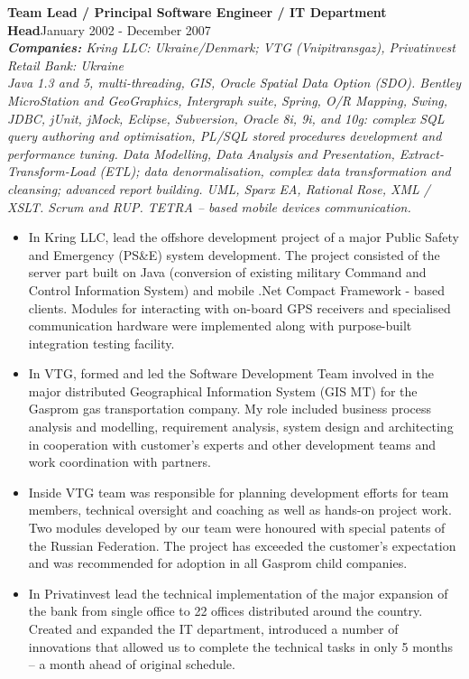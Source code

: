 \documentclass{res}
\newcommand{\aggjobdes}[4]{\needspace{3\baselineskip} %
{\noindent \bf #1\hspace{2ex}}{\hfill #2}\\
{{\noindent \small \textit{ \textbf{ Companies:} {\hfill #3}}}}\\{{\it \small #4.}}}
\begin{document}
\begin{resume}
\aggjobdes {Team Lead / Principal Software Engineer / IT Department Head}{January 2002 - December 2007}
{Kring LLC: Ukraine/Denmark; VTG (Vnipitransgaz), Privatinvest Retail Bank: Ukraine}
{Java 1.3 and 5, multi-threading, GIS, Oracle Spatial Data Option (SDO). Bentley MicroStation and GeoGraphics, Intergraph suite, Spring, O/R Mapping, Swing, JDBC, jUnit, jMock, Eclipse, Subversion, Oracle 8i, 9i, and 10g: complex SQL query authoring and optimisation, PL/SQL stored procedures development and performance tuning. Data Modelling, Data Analysis and Presentation, Extract-Transform-Load (ETL); data denormalisation, complex data transformation and cleansing; advanced report building.  UML, Sparx EA, Rational Rose, XML / XSLT. Scrum and RUP. TETRA – based mobile devices communication}
\begin{itemize} %
 \item In Kring LLC, lead the offshore development project of a major Public Safety and Emergency (PS\&E) system development. The project consisted of the server part built on Java (conversion of existing military Command and Control Information System) and mobile .Net Compact Framework - based clients. Modules for interacting with on-board GPS receivers and specialised communication hardware were implemented along with purpose-built integration testing facility.
 \item In VTG, formed and led the Software Development Team involved in the major distributed Geographical Information System (GIS MT) for the Gasprom gas transportation company. My role included business process analysis and modelling, requirement analysis, system design and architecting in cooperation with customer’s experts and other development teams and work coordination with partners.
 \item Inside VTG team was responsible for planning development efforts for team members, technical oversight and coaching as well as hands-on project work. Two modules developed by our team were honoured with special patents of the Russian Federation. The project has exceeded the customer’s expectation and was recommended for adoption in all Gasprom child companies.
 \item In Privatinvest lead the technical implementation of the major expansion of the bank from single office to 22 offices distributed around the country. Created and expanded the IT department, introduced a number of innovations that allowed us to complete the technical tasks in only 5 months – a month ahead of original schedule.
\end{itemize}


\end{resume}
\end{document}
